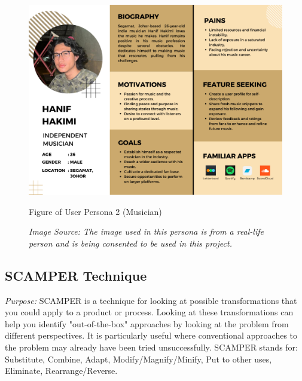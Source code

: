 \begin{figure}[h]
    \centering
    \includegraphics[width=0.9\linewidth]{mainmatter/images/userpersona2.png}
	\caption{Figure of User Persona 2 (Musician)}
    \caption*{\textit{Image Source: The image used in this persona is from a real-life person and is being consented to be used in this project.}}
    \label{fig:myfig41}
\end{figure}
\pagebreak

\subsection{SCAMPER Technique}
\textit{Purpose:} SCAMPER is a technique for looking at possible transformations that you could apply to a product or process. \parencite{santos15} Looking at these transformations can help you identify "out-of-the-box" approaches by looking at the problem from different perspectives. It is particularly useful where conventional approaches to the problem may already have been tried unsuccessfully. SCAMPER stands for: Substitute, Combine, Adapt, Modify/Magnify/Minify, Put to other uses, Eliminate, Rearrange/Reverse.
\pagebreak

